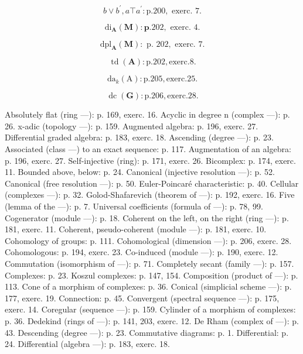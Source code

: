 \[
b \vee b ^ {\prime}, a \top a ^ {\prime}: \mathrm{p.} 2 0 0, \text {   exerc.   } 7.
\]

\[
\mathrm{di} _ {\mathbf {A}} (\mathbf {M}): \mathbf {p}. 2 0 2, \text {   exerc.   } 4.
\]

\[
\mathrm{dpl} _ {\mathbf {A}} (\mathbf {M}): \text { p. } 2 0 2, \text { exerc. } 7.
\]

\[
\operatorname{td} (\mathbf {A}): \mathrm{p.202,exerc.8.}
\]

\[
\mathrm{da} _ {k} (\mathrm{A}): \mathrm{p.205,exerc.25.}
\]

\[
\operatorname{dc} (\mathbf {G}): \mathrm{p.206,exerc.28.}
\]


Absolutely flat (ring ---): p. 169, exerc. 16. Acyclic in degree n (complex ---): p. 26. x-adic (topology ---): p. 159. Augmented algebra: p. 196, exerc. 27. Differential graded algebra: p. 183, exerc. 18. Ascending (degree ---): p. 23. Associated (class ---) to an exact sequence: p. 117. Augmentation of an algebra: p. 196, exerc. 27. Self-injective (ring): p. 171, exerc. 26. Bicomplex: p. 174, exerc. 11. Bounded above, below: p. 24. Canonical (injective resolution ---): p. 52. Canonical (free resolution ---): p. 50. Euler-Poincaré characteristic: p. 40. Cellular (complexes ---): p. 32. Golod-Shafarevich (theorem of ---): p. 192, exerc. 16. Five (lemma of the ---): p. 7. Universal coefficients (formula of ---): p. 78, 99. Cogenerator (module ---): p. 18. Coherent on the left, on the right (ring ---): p. 181, exerc. 11. Coherent, pseudo-coherent (module ---): p. 181, exerc. 10. Cohomology of groups: p. 111. Cohomological (dimension ---): p. 206, exerc. 28. Cohomologous: p. 194, exerc. 23. Co-induced (module ---): p. 190, exerc. 12. Commutation (isomorphism of ---): p. 71. Completely secant (family ---): p. 157. Complexes: p. 23. Koszul complexes: p. 147, 154. Composition (product of ---): p. 113. Cone of a morphism of complexes: p. 36. Conical (simplicial scheme ---): p. 177, exerc. 19. Connection: p. 45. Convergent (spectral sequence ---): p. 175, exerc. 14. Coregular (sequence ---): p. 159. Cylinder of a morphism of complexes: p. 36. Dedekind (rings of ---): p. 141, 203, exerc. 12. De Rham (complex of ---): p. 43. Descending (degree ---): p. 23. Commutative diagrams: p. 1. Differential: p. 24. Differential (algebra ---): p. 183, exerc. 18.

